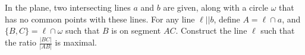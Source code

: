 In the plane, two intersecting lines $a$ and $b$ are given, along with a circle $\omega$ that has no common points with these lines. For any line $\ell||b$, define $A=\ell\cap a$, and $\{B,C\}=\ell\cap \omega$ such that $B$ is on segment $AC$. Construct the line $\ell$ such that the ratio $\frac{|BC|}{|AB|}$ is maximal.